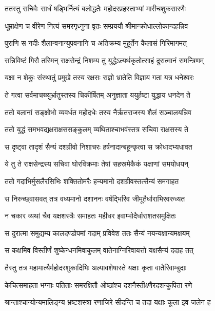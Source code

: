
\twolineshloka
{ततस्तु सचिवैः सार्धं षड्भिर्नित्यं बलोद्धतैः}
{महोदरप्रहस्ताभ्यां मारीचशुकसारणैः} %

\twolineshloka
{धूम्राक्षेण च वीरेण नित्यं समरगृध्नुना}
{वृतः सम्प्रययौ श्रीमान्क्रोधाल्लोकान्दहन्निव} %

\twolineshloka
{पुराणि स नदीः शैलान्वनान्युपवनानि च}
{अतिक्रम्य मुहूर्तेन कैलासं गिरिमागमत्} %

\twolineshloka
{सन्निविष्टं गिरौ तस्मिन् राक्षसेन्द्रं निशम्य तु}
{युद्धेऽत्यर्थकृतोत्साहं दुरात्मानं समन्त्रिणम्} %

\twolineshloka
{यक्षा न शेकुः संस्थातुं प्रमुखे तस्य रक्षसः}
{राज्ञो भ्रातेति विज्ञाय गता यत्र धनेश्वरः} %

\twolineshloka
{ते गत्वा सर्वमाचख्युर्भ्रातुस्तस्य चिकीर्षितम्}
{अनुज्ञाता ययुर्हष्टा युद्धाय धनदेन ते} %

\twolineshloka
{ततो बलानां सङ्क्षोभो व्यवर्धत महोदधेः}
{तस्य नैर्ऋतराजस्य शैलं सञ्चालयन्निव} %

\twolineshloka
{ततो युद्धं समभवद्यक्षराक्षससङ्कुलम्}
{व्यथिताश्चाभवंस्तत्र सचिवा राक्षसस्य ते} %

\twolineshloka
{स दृष्ट्वा तादृशं सैन्यं दशग्रीवो निशाचरः}
{हर्षनादान्बहून्कृत्वा स क्रोधादभ्यधावत} %

\twolineshloka
{ये तु ते राक्षसेन्द्रस्य सचिवा घोरविक्रमाः}
{तेषां सहस्रमेकैकं यक्षाणां समयोधयन्} %

\twolineshloka
{ततो गदाभिर्मुसलैरसिभिः शक्तितोमरैः}
{हन्यमानो दशग्रीवस्तत्सैन्यं समगाहत} %

\twolineshloka
{स निरुच्छ्वासवत् तत्र वध्यमानो दशाननः}
{वर्षद्भिरिव जीमूतैर्धाराभिरवरुध्यत} %

\twolineshloka
{न चकार व्यथां चैव यक्षशस्त्रैः समाहतः}
{महीधर इवाम्भोदैर्धाराशतसमुक्षितः} %

\twolineshloka
{स दुरात्मा समुद्यम्य कालदण्डोपमां गदाम्}
{प्रविवेश ततः सैन्यं नयन्यक्षान्यमक्षयम्} %

\twolineshloka
{स कक्षमिव विस्तीर्णं शुष्केन्धनमिवाकुलम्}
{वातेनाग्निरिवायत्तो यक्षसैन्यं ददाह तत्} %

\twolineshloka
{तैस्तु तत्र महामात्यैर्महोदरशुकादिभिः}
{अल्पावशेषास्ते यक्षाः कृता वातैरिवाम्बुदाः} %

\twolineshloka
{केचित्समाहता भग्नाः पतिताः समरक्षितौ}
{ओष्ठांश्च दशनैस्तीक्ष्णैरदशन्कुपिता रणे} %

\twolineshloka
{श्रान्ताश्चान्योन्यमालिङ्ग्य भ्रष्टशस्त्रा रणाजिरे}
{सीदन्ति च तदा यक्षाः कूला इव जलेन ह} %

